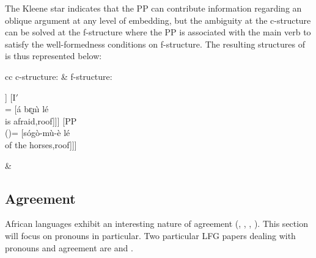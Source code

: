 \documentclass[output=paper,hidelinks]{langscibook}
\begin{document}
\ea\label{ex:African:36}
\z

The Kleene star indicates that the PP can contribute information regarding an oblique argument at any level of embedding, but the ambiguity at the c-structure can be solved at the f-structure where the PP is associated with the main verb to satisfy the well-formedness conditions on f-structure. The resulting structures of  is thus represented below:

\ea\label{ex:African:37}
\begin{tabular}[t]{cc}
c-structure: & f-structure:\\[1ex]
{\begin{forest}
    [IP [{IP\\\UP=\DOWN} [{NP\\(\UP\SUBJ)=\DOWN},baseline,[{\`e\\she},roof]]
        [{I$'$\\\UP=\DOWN} [{á bɛ̰n\`{\i} lé\\is afraid},roof]]]
        [{PP\\(\UP\OBL)=\DOWN} [{sóg\`{o}-m\`{u}-\`{e} lé\\of the horses},roof]]]
\end{forest}} & 
{}
\end{tabular}
\z

\subsection{Agreement}
\label{sec:African:2.3}

African languages exhibit an interesting nature of agreement (\citealt{BM87}, \citealt{Culy:FulaPronouns}, \citealt{Mchombo2004}, \citealt{Nsoh2011}). This section will focus on pronouns in particular. Two particular LFG papers dealing with pronouns and agreement are \citet{BM87} and \citet{Dalrymple2015}.
\end{document}
